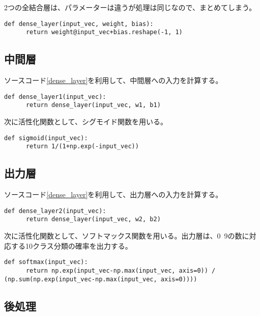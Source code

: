 \documentclass[platex,dvipdfmx]{jsarticle}
\begin{document}
  2つの全結合層は、パラメーターは違うが処理は同じなので、まとめてしまう。

  \begin{lstlisting}[caption=ex1.py, label=dense_layer]
    def dense_layer(input_vec, weight, bias):
      return weight@input_vec+bias.reshape(-1, 1)
  \end{lstlisting}

  \subsection{中間層}

  ソースコード\ref{dense_layer}を利用して、中間層への入力を計算する。

  \begin{lstlisting}[caption=ex1.py, label=dense_layer1]
    def dense_layer1(input_vec):
      return dense_layer(input_vec, w1, b1)
  \end{lstlisting}

  次に活性化関数として、シグモイド関数を用いる。

  \begin{lstlisting}[caption=ex1.py, label=sigmoid]
    def sigmoid(input_vec):
      return 1/(1+np.exp(-input_vec))
  \end{lstlisting}

  \subsection{出力層}

  ソースコード\ref{dense_layer}を利用して、出力層への入力を計算する。

  \begin{lstlisting}[caption=ex1.py, label=dense_layer2]
    def dense_layer2(input_vec):
      return dense_layer(input_vec, w2, b2)
  \end{lstlisting}

  次に活性化関数として、ソフトマックス関数を用いる。出力層は、0~9の数に対応する10クラス分類の確率を出力する。

  \begin{lstlisting}[caption=ex1.py, label=softmax]
    def softmax(input_vec):
      return np.exp(input_vec-np.max(input_vec, axis=0)) / (np.sum(np.exp(input_vec-np.max(input_vec, axis=0))))
  \end{lstlisting}

  \subsection{後処理}
\end{document}
